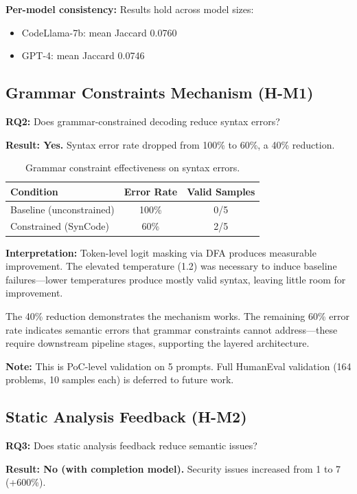 \textbf{Per-model consistency:} Results hold across model sizes:
\begin{itemize}
    \item CodeLlama-7b: mean Jaccard 0.0760
    \item GPT-4: mean Jaccard 0.0746
\end{itemize}

\subsection{Grammar Constraints Mechanism (H-M1)}

\textbf{RQ2:} Does grammar-constrained decoding reduce syntax errors?

\textbf{Result: Yes.} Syntax error rate dropped from 100\% to 60\%, a 40\% reduction.

\begin{table}[h]
\centering
\begin{tabular}{lcc}
\toprule
Condition & Error Rate & Valid Samples \\
\midrule
Baseline (unconstrained) & 100\% & 0/5 \\
Constrained (SynCode) & 60\% & 2/5 \\
\bottomrule
\end{tabular}
\caption{Grammar constraint effectiveness on syntax errors.}
\label{tab:grammar}
\end{table}

\textbf{Interpretation:} Token-level logit masking via DFA produces measurable improvement. The elevated temperature (1.2) was necessary to induce baseline failures---lower temperatures produce mostly valid syntax, leaving little room for improvement.

The 40\% reduction demonstrates the mechanism works. The remaining 60\% error rate indicates semantic errors that grammar constraints cannot address---these require downstream pipeline stages, supporting the layered architecture.

\textbf{Note:} This is PoC-level validation on 5 prompts. Full HumanEval validation (164 problems, 10 samples each) is deferred to future work.

\subsection{Static Analysis Feedback (H-M2)}

\textbf{RQ3:} Does static analysis feedback reduce semantic issues?

\textbf{Result: No (with completion model).} Security issues increased from 1 to 7 (+600\%).

